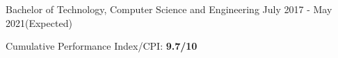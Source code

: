 \begin{cventries}
{\Large
  
  \cventryedu
  {Bachelor of Technology, Computer Science and Engineering}
  {}
  {}
  {July 2017 - May 2021(Expected)}
  {
    \begin{cvitems}
      \item Cumulative Performance Index/CPI: \textbf{9.7/10}
    \end{cvitems}
  }


}
\end{cventries}

